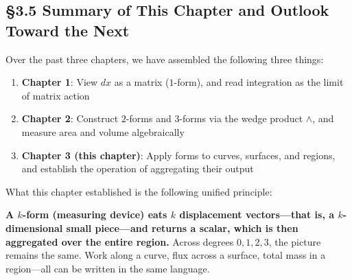 \hypertarget{summary-of-this-chapter-and-outlook-toward-the-next-1}{%
\subsection{§3.5 Summary of This Chapter and Outlook Toward the
Next}\label{summary-of-this-chapter-and-outlook-toward-the-next-1}}

Over the past three chapters, we have assembled the following three
things:

\begin{enumerate}
\def\labelenumi{\arabic{enumi}.}
\tightlist
\item
  \textbf{Chapter 1}: View \(dx\) as a matrix (\(1\)-form), and read
  integration as the limit of matrix action
\item
  \textbf{Chapter 2}: Construct \(2\)-forms and \(3\)-forms via the
  wedge product \(\wedge\), and measure area and volume algebraically
\item
  \textbf{Chapter 3 (this chapter)}: Apply forms to curves, surfaces,
  and regions, and establish the operation of aggregating their output
\end{enumerate}

What this chapter established is the following unified principle:

\textbf{A $k$-form (measuring device) eats $k$ displacement vectors—that is, a $k$-dimensional small piece—and returns a scalar, which is then aggregated over the entire region.}
Across degrees \(0,1,2,3\), the picture remains the same. Work along a
curve, flux across a surface, total mass in a region---all can be
written in the same language.


